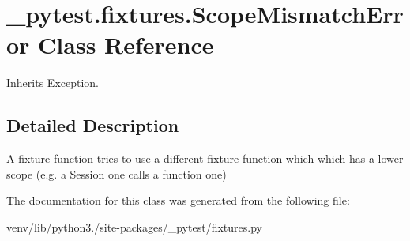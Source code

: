 \hypertarget{class__pytest_1_1fixtures_1_1_scope_mismatch_error}{}\section{\+\_\+pytest.\+fixtures.\+Scope\+Mismatch\+Error Class Reference}
\label{class__pytest_1_1fixtures_1_1_scope_mismatch_error}


Inherits Exception.



\subsection{Detailed Description}
\begin{DoxyVerb}A fixture function tries to use a different fixture function which
which has a lower scope (e.g. a Session one calls a function one)
\end{DoxyVerb}
 

The documentation for this class was generated from the following file\+:\begin{DoxyCompactItemize}
\item 
venv/lib/python3./site-\/packages/\+\_\+pytest/fixtures.\+py\end{DoxyCompactItemize}
